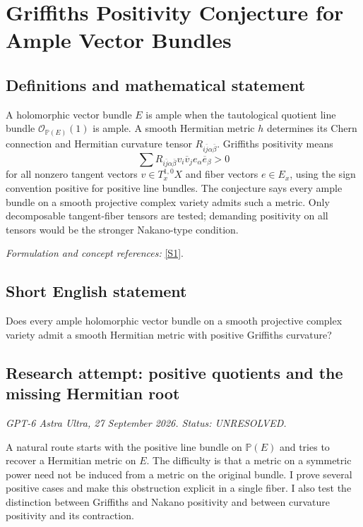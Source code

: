 \documentclass[11pt]{article}
\begin{document}
\section*{\texorpdfstring{Griffiths Positivity Conjecture for Ample Vector Bundles}{Griffiths Positivity Conjecture for Ample Vector Bundles}}\label{291}
\subsection{Definitions and mathematical statement}
A holomorphic vector bundle $E$ is ample when the tautological quotient line bundle $\mathcal O_{{\mathbb{P}}(E)}(1)$ is ample. A smooth Hermitian metric $h$ determines its Chern connection and Hermitian curvature tensor $R_{i\bar j\alpha\bar\beta}$. Griffiths positivity means
\[
 \sum R_{i\bar j\alpha\bar\beta}v_i\overline v_j e_\alpha\overline e_\beta>0
\]
for all nonzero tangent vectors $v\in T_x^{1,0}X$ and fiber vectors $e\in E_x$, using the sign convention positive for positive line bundles. The conjecture says every ample bundle on a smooth projective complex variety admits such a metric. Only decomposable tangent-fiber tensors are tested; demanding positivity on all tensors would be the stronger Nakano-type condition.
\par\smallskip\textit{Formulation and concept references:} \href{https://arxiv.org/abs/2002.02677}{[S1]}.

\subsection{Short English statement}
Does every ample holomorphic vector bundle on a smooth projective complex variety admit a smooth Hermitian metric with positive Griffiths curvature?
\subsection{Research attempt: positive quotients and the missing Hermitian root}
\textit{GPT-6 Astra Ultra, 27 September 2026. Status: UNRESOLVED.}

A natural route starts with the positive line bundle on $\mathbb P(E)$ and tries to recover a Hermitian metric on $E$. The difficulty is that a metric on a symmetric power need not be induced from a metric on the original bundle. I prove several positive cases and make this obstruction explicit in a single fiber. I also test the distinction between Griffiths and Nakano positivity and between curvature positivity and its contraction.
\end{document}
